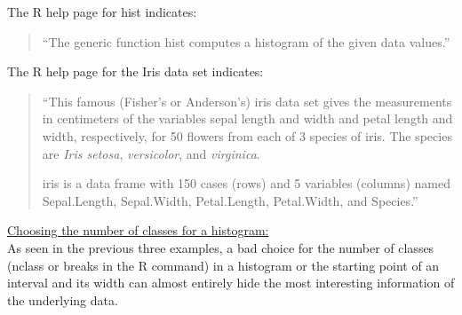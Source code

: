 \newpage


The R help page for hist indicates:
\begin{quotation}
``The generic function hist computes a histogram of the given data values.''
\end{quotation}


The R help page for the Iris data set indicates:
\begin{quotation}
``This famous (Fisher's or Anderson's) iris data set gives the measurements 
in centimeters of the variables sepal length and width and petal length and width, 
respectively, for 50 flowers from each of 3 species of iris. The species 
are {\it Iris setosa}, {\it versicolor}, and {\it virginica}.

iris is a data frame with 150 cases (rows) and 5 variables (columns) named 
Sepal.Length, Sepal.Width, Petal.Length, Petal.Width, and Species.''
\end{quotation}


\noindent
\underline{Choosing the number of classes for a histogram:} \\
As seen in the previous three examples, a bad choice for the number
of classes (nclass or breaks in the R command) in a histogram 
or the starting point of an interval and its width
can almost entirely hide the most
interesting information of the underlying data.

